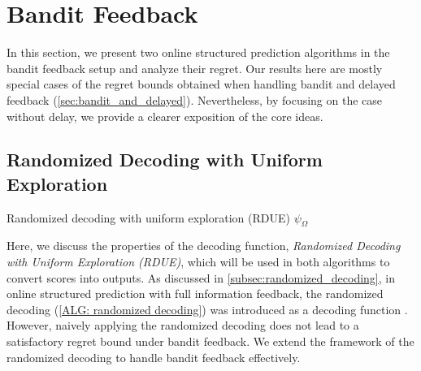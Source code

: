 \section{Bandit Feedback}
\label{sec:bandit}
In this section, we present two online structured prediction algorithms in the bandit feedback setup and analyze their regret.  
Our results here are mostly special cases of the regret bounds obtained when handling bandit and delayed feedback (\cref{sec:bandit_and_delayed}). 
Nevertheless, by focusing on the case without delay, we provide a clearer exposition of the core ideas.

\subsection{Randomized Decoding with Uniform Exploration}
\begin{algorithm}[t]
    \caption{Randomized decoding with uniform exploration (RDUE) $\psi_\Omega$}
    \label{ALG:randomized decoding with uniform exploration}
    \begin{algorithmic}[1]
        \Ensure{$\psi_\Omega(\thb)=\yh$}
    \end{algorithmic}
\end{algorithm}
Here, we discuss the properties of the decoding function, \emph{Randomized Decoding with Uniform Exploration (RDUE)}, which will be used in both algorithms to convert scores into outputs.  
As discussed in \cref{subsec:randomized_decoding}, in online structured prediction with full information feedback, the randomized decoding (\cref{ALG: randomized decoding}) was introduced as a decoding function \citep{pmlr-v247-sakaue24a}.  
However, naively applying the randomized decoding does not lead to a satisfactory regret bound under bandit feedback.  
We extend the framework of the randomized decoding to handle bandit feedback effectively.

